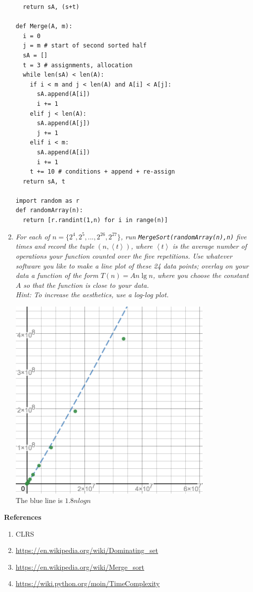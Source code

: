 \documentclass[12pt]{article} \setlength{\oddsidemargin}{0in}
\begin{document}
\begin{enumerate}
\begin{verbatim}
  return sA, (s+t) 

def Merge(A, m):
  i = 0 
  j = m # start of second sorted half
  sA = []
  t = 3 # assignments, allocation
  while len(sA) < len(A):
    if i < m and j < len(A) and A[i] < A[j]:
      sA.append(A[i])
      i += 1
    elif j < len(A):
      sA.append(A[j])
      j += 1
    elif i < m:
      sA.append(A[i])
      i += 1
    t += 10 # conditions + append + re-assign
  return sA, t

import random as r
def randomArray(n):
  return [r.randint(1,n) for i in range(n)]
\end{verbatim}

\pagebreak

\item\textit{For each of $n = \{2^4,2^5,...,2^{26},2^{27}\}$, run \texttt{MergeSort(randomArray(n),n)} five times and record the tuple $(n, \left<t\right>)$, where $\left<t\right>$ is the average number of operations your function counted over the five repetitions. Use whatever software you like to make a line plot of these 24 data points; overlay on your data a function of the form $T(n) = An\lg n$, where you choose the constant $A$ so that the function is close to your data.\\
Hint: To increase the aesthetics, use a log-log plot.}

\includegraphics[width=10cm,height=10cm]{p5b} \\

The blue line is $1.8nlogn$

\end{enumerate}


\newpage

\textbf{References} \\
\hrulefill
\begin{enumerate}
  \item CLRS
  \item \url{https://en.wikipedia.org/wiki/Dominating_set}
  \item \url{https://en.wikipedia.org/wiki/Merge_sort}
  \item \url{https://wiki.python.org/moin/TimeComplexity}
\end{enumerate}
\end{document}
